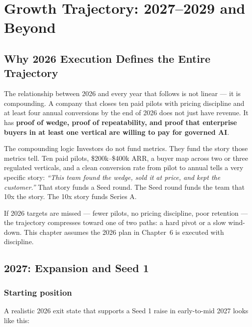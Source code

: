 \chapter{Growth Trajectory: 2027--2029 and Beyond}

\section{Why 2026 Execution Defines the Entire Trajectory}

The relationship between 2026 and every year that follows is not linear — it is
compounding. A company that closes ten paid pilots with pricing discipline and
at least four annual conversions by the end of 2026 does not just have revenue.
It has \textbf{proof of wedge, proof of repeatability, and proof that enterprise
buyers in at least one vertical are willing to pay for governed AI}.

\begin{insightbox}{The compounding logic}
Investors do not fund metrics. They fund the story those metrics tell. Ten paid
pilots, \$200k--\$400k ARR, a buyer map across two or three regulated verticals,
and a clean conversion rate from pilot to annual tells a very specific story:
\textit{``This team found the wedge, sold it at price, and kept the customer.''}
That story funds a Seed round. The Seed round funds the team that 10x the
story. The 10x story funds Series A.
\end{insightbox}

If 2026 targets are missed — fewer pilots, no pricing discipline, poor
retention — the trajectory compresses toward one of two paths: a hard pivot or
a slow wind-down. This chapter assumes the 2026 plan in Chapter~6 is executed
with discipline.

\section{2027: Expansion and Seed 1}

\subsection{Starting position}

A realistic 2026 exit state that supports a Seed 1 raise in early-to-mid 2027
looks like this:

